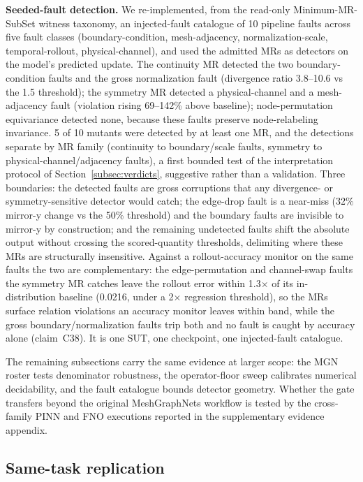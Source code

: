\documentclass[preprint,12pt,authoryear]{elsarticle}
\begin{document}
\textbf{Seeded-fault detection.} We re-implemented, from the read-only Minimum-MR-SubSet witness taxonomy, an injected-fault catalogue of 10 pipeline faults across five fault classes (boundary-condition, mesh-adjacency, normalization-scale, temporal-rollout, physical-channel), and used the admitted MRs as detectors on the model's predicted update. The continuity MR detected the two boundary-condition faults and the gross normalization fault (divergence ratio 3.8--10.6 vs the 1.5 threshold); the symmetry MR detected a physical-channel and a mesh-adjacency fault (violation rising 69--142\% above baseline); node-permutation equivariance detected none, because these faults preserve node-relabeling invariance. 5 of 10 mutants were detected by at least one MR, and the detections separate by MR family (continuity to boundary/scale faults, symmetry to physical-channel/adjacency faults), a first bounded test of the interpretation protocol of Section~\ref{subsec:verdicts}, suggestive rather than a validation. Three boundaries: the detected faults are gross corruptions that any divergence- or symmetry-sensitive detector would catch; the edge-drop fault is a near-miss (32\% mirror-y change vs the 50\% threshold) and the boundary faults are invisible to mirror-y by construction; and the remaining undetected faults shift the absolute output without crossing the scored-quantity thresholds, delimiting where these MRs are structurally insensitive. Against a rollout-accuracy monitor on the same faults the two are complementary: the edge-permutation and channel-swap faults the symmetry MR catches leave the rollout error within 1.3$\times$ of its in-distribution baseline (0.0216, under a 2$\times$ regression threshold), so the MRs surface relation violations an accuracy monitor leaves within band, while the gross boundary/normalization faults trip both and no fault is caught by accuracy alone (claim~C38). It is one SUT, one checkpoint, one injected-fault catalogue.

The remaining subsections carry the same evidence at larger scope: the MGN roster tests denominator robustness, the operator-floor sweep calibrates numerical decidability, and the fault catalogue bounds detector geometry. Whether the gate transfers beyond the original MeshGraphNets workflow is tested by the cross-family PINN and FNO executions reported in the supplementary evidence appendix.

\subsection{Same-task replication}
\label{subsec:multicheckpoint-replication}
\end{document}
